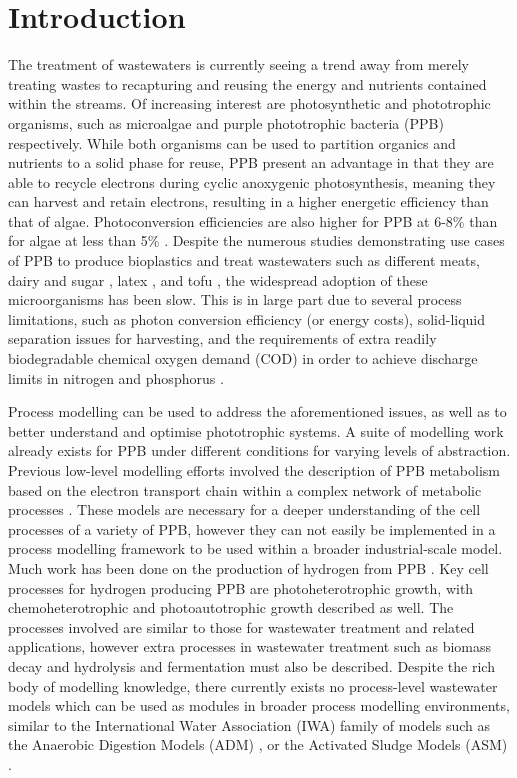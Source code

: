 \section{Introduction}
\label{Sec:chap2_intro}

The treatment of wastewaters is currently seeing a trend away from merely treating wastes to recapturing and reusing the energy and nutrients contained within the streams. Of increasing interest are photosynthetic and phototrophic organisms, such as microalgae \cite{Ward2014} and purple phototrophic bacteria (PPB) \cite{Hulsen2014} respectively. While both organisms can be used to partition organics and nutrients to a solid phase for reuse, PPB present an advantage in that they are able to recycle electrons during cyclic anoxygenic photosynthesis, meaning they can harvest and retain electrons, resulting in a higher energetic efficiency than that of algae. Photoconversion efficiencies are also higher for PPB at 6-8\% \cite{Miyake1987} than for algae at less than 5\% \cite{Posten2009}. Despite the numerous studies demonstrating use cases of PPB to produce bioplastics \cite{Melnicki2009} and treat wastewaters such as different meats, dairy and sugar \cite{Hulsen2018}, latex \cite{Kantachote2005}, and tofu \cite{Zhu1999}, the widespread adoption of these microorganisms has been slow. This is in large part due to several process limitations, such as photon conversion efficiency (or energy costs), solid-liquid separation issues for harvesting, and the requirements of extra readily biodegradable chemical oxygen demand (COD) in order to achieve discharge limits in nitrogen and phosphorus \cite{Hulsen2015}.

Process modelling can be used to address the aforementioned issues, as well as to better understand and optimise phototrophic systems. A suite of modelling work already exists for PPB under different conditions for varying levels of abstraction. Previous low-level modelling efforts involved the description of PPB metabolism based on the electron transport chain within a complex network of metabolic processes \cite{Golomysova2010}. These models are necessary for a deeper understanding of the cell processes of a variety of PPB, however they can not easily be implemented in a process modelling framework to be used within a broader industrial-scale model. Much work has been done on the production of hydrogen from PPB \cite{Eroglu2008}. Key cell processes for hydrogen producing PPB are photoheterotrophic growth, with chemoheterotrophic and photoautotrophic growth described as well. The processes involved are similar to those for wastewater treatment and related applications, however extra processes in wastewater treatment such as biomass decay and hydrolysis and fermentation must also be described. Despite the rich body of modelling knowledge, there currently exists no process-level wastewater models which can be used as modules in broader process modelling environments, similar to the International Water Association (IWA) family of models \cite{Henze1987} such as the Anaerobic Digestion Models (ADM) \cite{Batstone2002}, or the Activated Sludge Models (ASM) \cite{Gujer1999}. 

